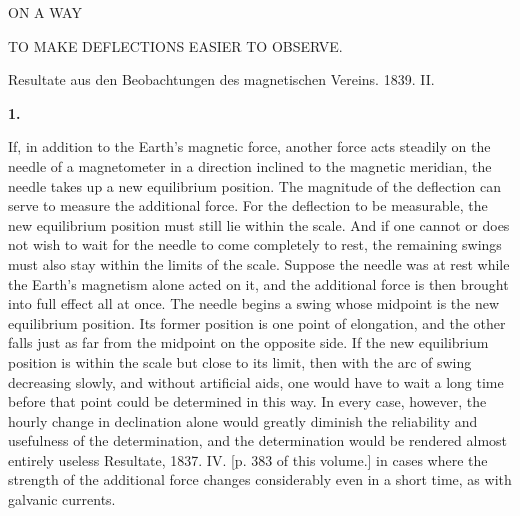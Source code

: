 \clearpage
{}
\begin{center}
{\large ON A WAY\par\medskip TO MAKE DEFLECTIONS EASIER TO OBSERVE.}
\par\medskip
Resultate aus den Beobachtungen des magnetischen Vereins. 1839. II.
\end{center}
\par\medskip{}\centerline{\textbf{1.}}\nobreak\smallskip
If, in addition to the Earth’s magnetic force, another force acts steadily on the needle of a magnetometer in a direction inclined to the magnetic meridian, the needle takes up a new equilibrium position. The magnitude of the deflection can serve to measure the additional force. For the deflection to be measurable, the new equilibrium position must still lie within the scale. And if one cannot or does not wish to wait for the needle to come completely to rest, the remaining swings must also stay within the limits of the scale. Suppose the needle was at rest while the Earth’s magnetism alone acted on it, and the additional force is then brought into full effect all at once. The needle begins a swing whose midpoint is the new equilibrium position. Its former position is one point of elongation, and the other falls just as far from the midpoint on the opposite side. If the new equilibrium position is within the scale but close to its limit, then with the arc of swing decreasing slowly, and without artificial aids, one would have to wait a long time before that point could be determined in this way. In every case, however, the hourly change in declination alone would greatly diminish the reliability and usefulness of the determination, and the determination would be rendered almost entirely useless
\expandafter\def\csname HistoricalNoteText404\endcsname{Resultate, 1837. IV. [p. 383 of this volume.]}
\renewcommand{\Article}[1]{\par\medskip\Needspace{4\baselineskip}\pdfbookmark[1]{#1.}{ablenkungen-art-#1}\centerline{\textbf{#1.}}\nobreak\smallskip}%
in cases where the strength of the additional force changes considerably even in a short time, as with galvanic currents.

